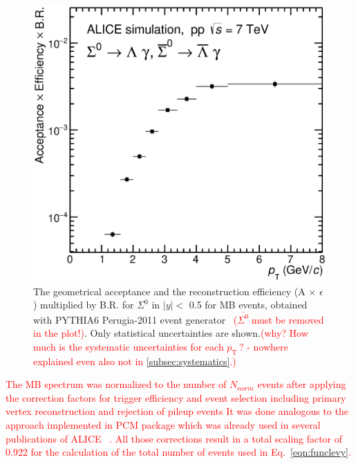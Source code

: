 \documentclass[ALICE,manyauthors]{cernphprep}
\newcommand{\asig}{\ensuremath{\overline{\Sigma^0} \; }}
\newcommand{\pt}{\ensuremath{p_{\mathrm{T}\; }}}
\newcommand{\red}{\textcolor{red}}
\newcommand{\blue}{\textcolor{blue}}
\begin{document}
\begin{figure}[bt]
\centering  
      \includegraphics[width=10.cm]{Figure/2017oct31-Sigma0-AccEffi.eps}

  \caption{The geometrical acceptance and the reconstruction efficiency
  (A $\times$ $\epsilon$) multiplied by B.R. for $\Sigma^{0}$ in $ |y| <$ 0.5 for 
  MB events, obtained with PYTHIA6 Perugia-2011 event generator~\cite{cite:pythia6}
  \red{(\asig must be removed in the plot!)}.
  Only statistical uncertainties are shown.\red{(why? How much is the systematic uncertainties for each \pt?
  - nowhere explained even also not in \ref{subsec:systematics}.)}}
  \label{fig:efficiency}
\end{figure}

\red{The MB spectrum was normalized to the number of 
$N_{norm}$ events after applying the correction factors for trigger efficiency and event 
selection including primary vertex reconstruction and rejection of pileup events
It was done analogous to the approach implemented in PCM package which 
was already  used in several publications of ALICE~\cite{cite:ALICE2015-InclPhot-pp,cite:ALICE-DirPhot2016} .
All those corrections result in a total scaling factor of 0.922 for the calculation of the total  
number of events used in Eq.~\ref{eqn:funclevy}.}
\end{document}
